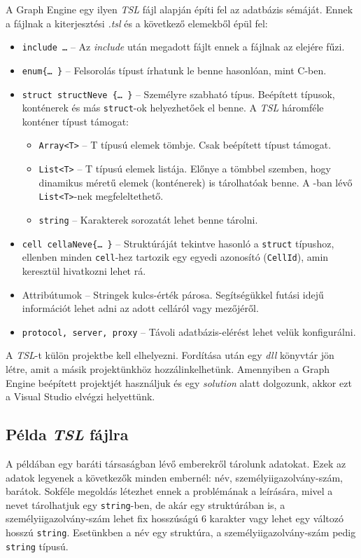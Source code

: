 A Graph Engine egy ilyen \emph{TSL} fájl alapján építi fel az adatbázis sémáját. Ennek a fájlnak a kiterjesztési \emph{.tsl} és a következő elemekből épül fel:
\begin{itemize}
	\item \texttt{include \ldots{}} \--- Az \emph{include} után megadott fájlt ennek a fájlnak az elejére fűzi.
	\item \texttt{enum\{\ldots{} \}} \--- Felsorolás típust írhatunk le benne hasonlóan, mint C-ben.
	\item \texttt{struct structNeve \{\ldots{} \}} \--- Személyre szabható típus. Beépített típusok, konténerek és más \texttt{struct}-ok helyezhetőek el benne. A \emph{TSL} háromféle konténer típust támogat:
	\begin{itemize}
		\item \texttt{Array<T>} \--- T típusú elemek tömbje. Csak beépített típust támogat.
		\item \texttt{List<T>} \--- T típusú elemek listája. Előnye a tömbbel szemben, hogy dinamikus méretű elemek (konténerek) is tárolhatóak benne. A \Csh{}-ban lévő \texttt{List<T>}-nek megfeleltethető.
		 \item \texttt{string} \--- Karakterek sorozatát lehet benne tárolni.
	\end{itemize}
	\item \texttt{cell cellaNeve\{\ldots{} \}} \--- Struktúráját tekintve hasonló a \texttt{struct} típushoz, ellenben minden \texttt{cell}-hez tartozik egy egyedi azonosító (\texttt{CellId}), amin keresztül hivatkozni lehet rá. 
	\item Attribútumok \--- Stringek kulcs-érték párosa. Segítségükkel futási idejű információt lehet adni az adott celláról vagy mezőjéről.
	\item \texttt{protocol, server, proxy} \--- Távoli adatbázis-elérést lehet velük konfigurálni.
\end{itemize}

A \emph{TSL}-t külön projektbe kell elhelyezni. Fordítása után egy \emph{dll} könyvtár jön létre, amit a másik \Csh{} projektünkhöz hozzálinkelhetünk. Amennyiben a Graph Engine beépített projektjét használjuk és egy \emph{solution} alatt dolgozunk, akkor ezt a Visual Studio elvégzi helyettünk. 

\subsection{Példa \emph{TSL} fájlra}

A példában egy baráti társaságban lévő emberekről tárolunk adatokat. Ezek az adatok legyenek a következők minden embernél: név, személyiigazolvány-szám, barátok. Sokféle megoldás létezhet ennek a problémának a leírására, mivel a nevet tárolhatjuk egy \texttt{string}-ben, de akár egy struktúrában is, a személyiigazolvány-szám lehet fix hosszúságú 6 karakter vagy lehet egy változó hosszú \texttt{string}. Esetünkben a név egy struktúra, a  személyiigazolvány-szám pedig \texttt{string} típusú.

